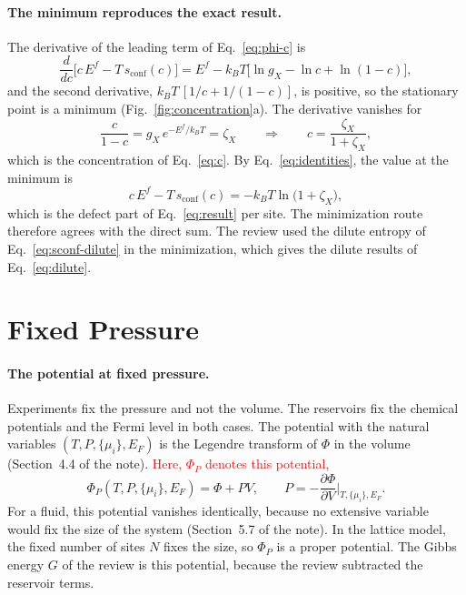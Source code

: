 \documentclass[11pt]{article}      %
\numberwithin{equation}{section}   %
\begin{document}
\paragraph{The minimum reproduces the exact result.}
The derivative of the leading term of Eq.~\eqref{eq:phi-c} is
\begin{equation*}
    \frac{d}{dc}\big[c\,E^f-T\,s_{\text{conf}}(c)\big]
    =E^f-k_BT\big[\ln g_X-\ln c+\ln(1-c)\big],
\end{equation*}
and the second derivative, $k_BT\,[1/c+1/(1-c)]$, is positive, so the
stationary point is a minimum (Fig.~\ref{fig:concentration}a). The
derivative vanishes for
\begin{equation*}
    \frac{c}{1-c}=g_X\,e^{-E^f/k_BT}=\zeta_X
    \qquad\Longrightarrow\qquad
    c=\frac{\zeta_X}{1+\zeta_X},
\end{equation*}
which is the concentration of Eq.~\eqref{eq:c}. By
Eq.~\eqref{eq:identities}, the value at the minimum is
\begin{equation*}
    c\,E^f-T\,s_{\text{conf}}(c)=-k_BT\ln\big(1+\zeta_X\big),
\end{equation*}
which is the defect part of Eq.~\eqref{eq:result} per site. The
minimization route therefore agrees with the direct sum. The review used
the dilute entropy of Eq.~\eqref{eq:sconf-dilute} in the minimization, which
gives the dilute results of Eq.~\eqref{eq:dilute}.

\section{Fixed Pressure}

\paragraph{The potential at fixed pressure.}
Experiments fix the pressure and not the volume. The reservoirs fix the
chemical potentials and the Fermi level in both cases. The potential with
the natural variables $(T,P,\{\mu_i\},E_F)$ is the Legendre transform of
$\Phi$ in the volume (Section~4.4 of the note). \textcolor{red}{Here,
$\Phi_P$ denotes this potential,}
\begin{equation*}
    \Phi_P(T,P,\{\mu_i\},E_F)=\Phi+PV,
    \qquad
    P=-\frac{\partial\Phi}{\partial V}\bigg|_{T,\{\mu_i\},E_F}.
\end{equation*}
For a fluid, this potential vanishes identically, because no extensive
variable would fix the size of the system (Section~5.7 of the note). In the
lattice model, the fixed number of sites $N$ fixes the size, so $\Phi_P$ is
a proper potential. The Gibbs energy $G$ of the review is this potential,
because the review subtracted the reservoir terms.
\end{document}
